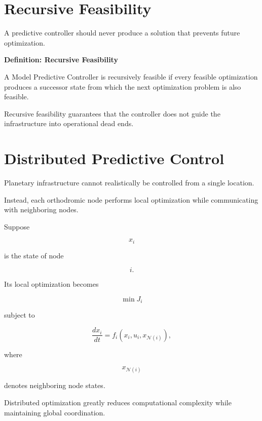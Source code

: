 \documentclass[11pt,fleqn]{book}
\numberwithin{equation}{chapter}
\newenvironment{definition}[1]
  {\begin{definitionEnv}
   \noindent\textbf{Definition: #1}\par\smallskip}
  {\end{definitionEnv}}
\theoremstyle{plain}
\theoremstyle{definition}
\theoremstyle{remark}
\begin{document}

\section{Recursive Feasibility}

A predictive controller should never produce a solution that prevents
future optimization.


\begin{definition}{Recursive Feasibility}

A Model Predictive Controller is recursively feasible if every feasible
optimization produces a successor state from which the next optimization
problem is also feasible.

\end{definition}

Recursive feasibility guarantees that the controller does not guide the
infrastructure into operational dead ends.


\section{Distributed Predictive Control}

Planetary infrastructure cannot realistically be controlled from a
single location.

Instead, each orthodromic node performs local optimization while
communicating with neighboring nodes.

Suppose

\[
x_i
\]

is the state of node

\[
i.
\]

Its local optimization becomes

\[
\min
J_i
\]

subject to

\[
\frac{dx_i}{dt}
=
f_i(x_i,u_i,x_{\mathcal N(i)}),
\]

where

\[
x_{\mathcal N(i)}
\]

denotes neighboring node states.

Distributed optimization greatly reduces computational complexity while
maintaining global coordination.
\end{document}
